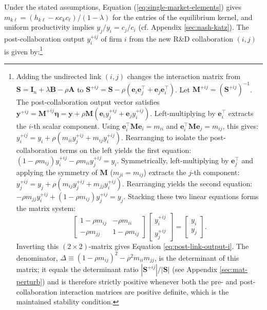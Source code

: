 Under the stated assumptions, Equation (\ref{eq:single-market-elements}) gives $m_{k\ell} = (h_{k\ell} - \kappa c_k c_\ell)/(1-\lambda)$ for the entries of the equilibrium kernel, and uniform productivity implies $y_j/y_i = c_j/c_i$ (cf. Appendix \ref{sec:nash-katz}). The post-collaboration output $y_{i}^{+ij}$ of firm $i$ from the new R\&D collaboration $(i,j)$ is given by:\footnote{\label{foot:rem-two}Adding the undirected link $(i,j)$ changes the
interaction matrix from
$
\mathbf S
=
\mathbf I_n+\lambda\mathbf B-\rho\mathbf A
$
to
$
\mathbf S^{+ij}
=
\mathbf S
-
\rho
\left(
\mathbf e_i\mathbf e_j^\top
+
\mathbf e_j\mathbf e_i^\top
\right)$.
Let
$
\mathbf M^{+ij}
=
\left(\mathbf S^{+ij}\right)^{-1}$. The post-collaboration output vector satisfies
$
\mathbf y^{+ij}
=
\mathbf M^{+ij}\bm{\eta}
=
\mathbf y
+
\rho\mathbf M
\left(
\mathbf e_i y_{j}^{+ij}
+
\mathbf e_j y_{i}^{+ij}
\right)$. Left-multiplying by $\mathbf{e}_i^\top$ extracts the $i$-th scalar component. Using $\mathbf{e}_i^\top \mathbf{M} \mathbf{e}_i = m_{ii}$ and $\mathbf{e}_i^\top \mathbf{M} \mathbf{e}_j = m_{ij}$, this gives:
$ y_i^{+ij} = y_i + \rho \left( m_{ii} y_j^{+ij} + m_{ij} y_i^{+ij} \right)$. Rearranging to isolate the post-collaboration terms on the left yields the first equation:
$ (1 - \rho m_{ij}) y_i^{+ij} - \rho m_{ii} y_j^{+ij} = y_i $. Symmetrically, left-multiplying by $\mathbf{e}_j^\top$ and applying the symmetry of $\mathbf{M}$ ($m_{ji} = m_{ij}$) extracts the $j$-th component:
$ y_j^{+ij} = y_j + \rho \left( m_{ij} y_j^{+ij} + m_{jj} y_i^{+ij} \right)$. Rearranging yields the second equation:
$ -\rho m_{jj} y_i^{+ij} + (1 - \rho m_{ij}) y_j^{+ij} = y_j $. Stacking these two linear equations forms the matrix system:
\begin{equation}
\begin{bmatrix}
1 - \rho m_{ij} & -\rho m_{ii} \\
-\rho m_{jj} & 1 - \rho m_{ij}
\end{bmatrix}
\begin{bmatrix}
y_i^{+ij} \\
y_j^{+ij}
\end{bmatrix}
=
\begin{bmatrix}
y_i \\
y_j
\end{bmatrix}.
\label{eq:two-by-two}
\end{equation}
Inverting this $(2 \times 2)$-matrix gives Equation \eqref{eq:post-link-output-i}. The denominator, $\Delta \equiv (1-\rho m_{ij})^2 - \rho^2 m_{ii}m_{jj}$, is the determinant of this matrix; it equals the determinant ratio $|\mathbf{S}^{+ij}|/|\mathbf{S}|$ (see Appendix \ref{sec:mat-perturb}) and is therefore strictly positive whenever both the pre- and post-collaboration interaction matrices are positive definite, which is the maintained stability condition.} %
